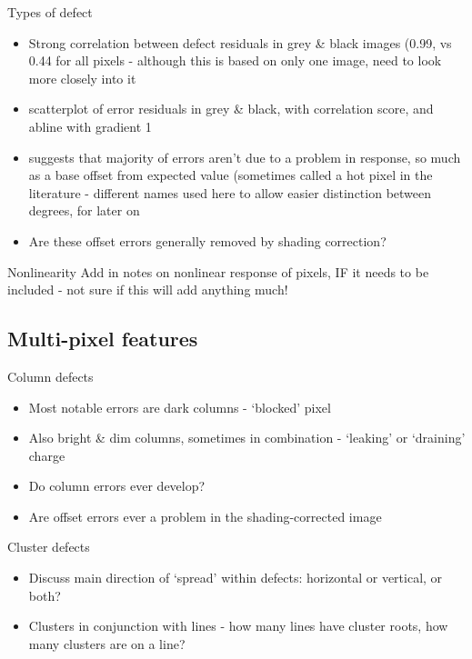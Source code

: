 \documentclass{beamer}
\begin{document}
\begin{frame}{Types of defect}%
  \begin{itemize}
  		\item Strong correlation between defect residuals in grey \& black images (0.99, vs 0.44 for all pixels - although this is based on only one image, need to look more closely into it
  		\item scatterplot of error residuals in grey \& black, with correlation score, and abline with gradient 1
  		\item suggests that majority of errors aren't due to a problem in response, so much as a base offset from expected value (sometimes called a hot pixel in the literature - different names used here to allow easier distinction between degrees, for later on
  		\item Are these offset errors generally removed by shading correction?
  \end{itemize}
\end{frame}

\begin{frame}{Nonlinearity}
	Add in notes on nonlinear response of pixels, IF it needs to be included - not sure if this will add anything much!
\end{frame}


\subsection{Multi-pixel features}

\begin{frame}{Column defects}
	
	\begin{itemize}
		\item Most notable errors are dark columns - `blocked' pixel
		\item Also bright \& dim columns, sometimes in combination - `leaking' or `draining' charge
		\item Do column errors ever develop?
		\item Are offset errors ever a problem in the shading-corrected image 
	\end{itemize}
\end{frame}


\begin{frame}{Cluster defects}

	\begin{itemize}
		\item Discuss main direction of `spread' within defects: horizontal or vertical, or both?
		\item Clusters in conjunction with lines - how many lines have cluster roots, how many clusters are on a line?
	\end{itemize}

\end{frame}
\end{document}
